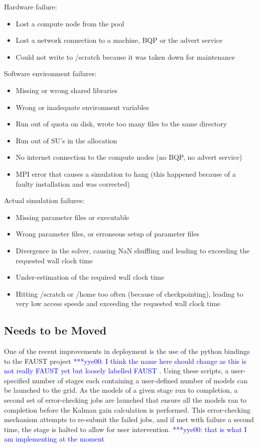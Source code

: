 \documentclass[conference,final]{IEEEtran}
\newcommand{\yyenote}[1]{ {\textcolor{blue} { ***yye00: #1 }}}
\begin{document}
Hardware failure:
\begin{itemize}
\item{Lost a compute node from the pool}
\item{Lost a network connection to a machine, BQP or the advert service}
\item{Could not write to /scratch because it was taken down for maintenance}
\end{itemize}

Software environment failures:
\begin{itemize}
\item{Missing or wrong shared libraries}
\item{Wrong or inadequate environment variables}
\item{Run out of quota on disk, wrote too many files to the same directory}
\item{Run out of SU's in the allocation}
\item{No internet connection to the compute nodes (no BQP, no advert service)}
\item{MPI error that causes a simulation to hang (this happened because of a faulty installation and was corrected)}
\end{itemize}

Actual simulation failures:
\begin{itemize}
\item{Missing parameter files or executable}
\item{Wrong parameter files, or erroneous setup of parameter files}
\item{Divergence in the solver, causing NaN shuffling and leading to exceeding the requested wall clock time}
\item{Under-estimation of the required wall clock time}
\item{Hitting /scratch or /home too often (because of checkpointing), leading to very low access speeds and exceeding the requested wall clock time}
\end{itemize}

\subsection{Needs to be Moved}
One of the recent improvements in deployment is the use of the
python bindings to the FAUST project \yyenote{I think the name here should change
as this is not really FAUST yet but loosely labelled FAUST}. Using
these scripts, a user-specified number of stages each containing
a user-defined number of models can be launched to the grid. As the
models of a given stage run to completion, a second set of error-checking
jobs are launched that ensure all the models ran to completion before
the Kalman gain calculation is performed. This error-checking mechanism
attempts to re-submit the failed jobs, and if met with failure a second time, 
the stage is halted to allow for user intervention. \yyenote{that is what I am implementing at the moment} 
\end{document}
